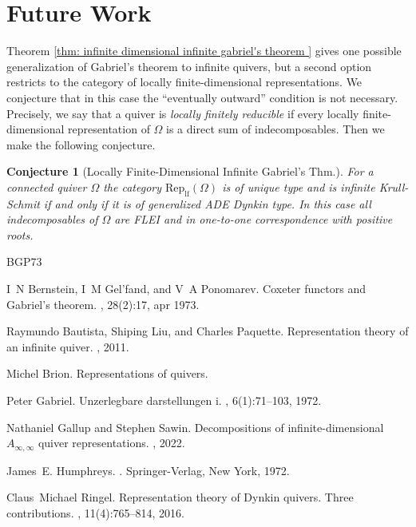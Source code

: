 \documentclass{article}
\newtheorem{conjecture}{Conjecture}[section]
\begin{document}

\section{Future Work} \label{sec: future work}

Theorem \ref{thm: infinite dimensional infinite gabriel's theorem } gives one possible generalization of Gabriel's theorem to infinite quivers, but a second option restricts to the category of locally finite-dimensional representations. We conjecture that in this case the ``eventually outward'' condition is not necessary. Precisely, we say that a quiver is \emph{locally finitely reducible} if every locally finite-dimensional representation of $\Omega$ is a direct sum of indecomposables. Then we make the following conjecture. 

\begin{conjecture}[Locally Finite-Dimensional Infinite Gabriel's Thm.]
For a connected quiver $\Omega$ the category $\text{Rep}_{\text{lf}}(\Omega)$ is of unique type and is infinite Krull-Schmit if and only if it is of generalized ADE Dynkin type. In this case all indecomposables of $\Omega$ are FLEI and in one-to-one correspondence with positive roots.
\end{conjecture}


\begin{thebibliography}{BGP73}

I~N Bernstein, I~M Gel'fand, and V~A Ponomarev.
\newblock Coxeter functors and {Gabriel}'s theorem.
, 28(2):17, apr 1973.

Raymundo Bautista, Shiping Liu, and Charles Paquette.
\newblock Representation theory of an infinite quiver.
, 2011.

Michel Brion.
\newblock Representations of quivers.

Peter Gabriel.
\newblock Unzerlegbare darstellungen i.
, 6(1):71--103, 1972.

Nathaniel Gallup and Stephen Sawin.
\newblock Decompositions of infinite-dimensional ${A}_{\infty,\infty}$ quiver
  representations.
, 2022.

James~E. Humphreys.
.
\newblock Springer-Verlag, New York, 1972.

Claus~Michael Ringel.
\newblock Representation theory of {Dynkin} quivers. {Three} contributions.
, 11(4):765--814, 2016.

\end{thebibliography}
\end{document}
